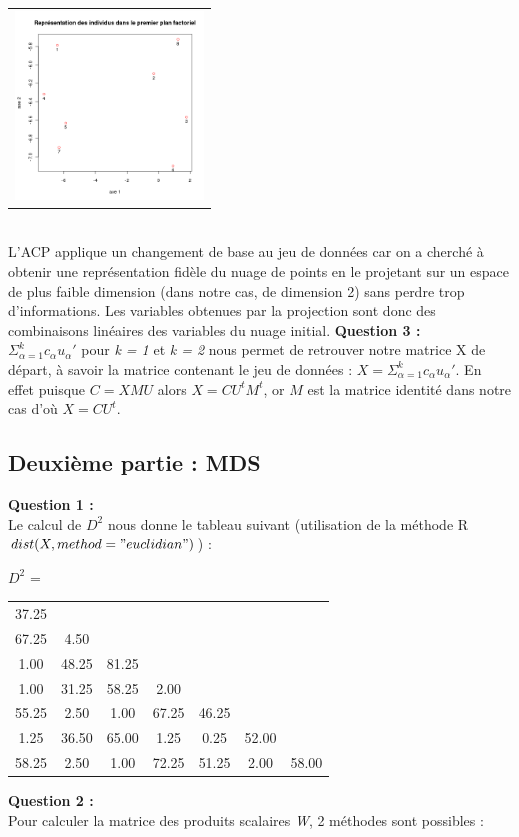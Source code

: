 \documentclass[a4paper, 10pt]{article}
\begin{document}
\hspace*{1cm}
\begin{tabular}{c}
\includegraphics[height = 5cm, width = 5cm]{plots/biplot_exo1_princomp.png}\\
\end{tabular}\\
L'ACP applique un changement de base au jeu de données car on a cherché à obtenir une représentation fidèle du nuage de points en
le projetant sur un espace de plus faible dimension (dans notre cas, de dimension 2) sans perdre trop d'informations.
Les variables obtenues par la projection sont donc des combinaisons linéaires des variables du nuage initial.
\newpage
\noindent
\textbf{Question 3 :}\\
$\varSigma^{k}_{\alpha=1} c_{\alpha}u_{\alpha}'$ pour \textit{k = 1} et \textit{k = 2} nous permet de retrouver notre matrice X de départ,
à savoir la matrice contenant le jeu de données : $X = \varSigma^{k}_{\alpha=1} c_{\alpha}u_{\alpha}'$. En effet puisque $C = XMU$ alors $X = CU^{t}M^{t}$, or $M$ est la matrice identité dans notre cas d'où $X = CU^{t}$.

\subsection*{Deuxième partie : MDS}
\textbf{Question 1 :}\\
Le calcul de \textit{$D^{2}$} nous donne le tableau suivant (utilisation de la méthode R $dist(X, method = "euclidian")$) :
\begin{center}
$D^{2}$ = 
\begin{tabular}{|ccccccc|}
37.25 & & & & & & \\
67.25 & 4.50 & & & & & \\
1.00 & 48.25 & 81.25 & & & & \\
1.00 & 31.25 & 58.25 & 2.00 & & & \\
55.25 & 2.50 & 1.00 & 67.25 & 46.25 & & \\
1.25 & 36.50 & 65.00 & 1.25 & 0.25 & 52.00 & \\
58.25 & 2.50 & 1.00 & 72.25 & 51.25 & 2.00 & 58.00 \\
\end{tabular}
\end{center}
\textbf{Question 2 :}\\
Pour calculer la matrice des produits scalaires \textit{W}, 2 méthodes sont possibles :
\end{document}
